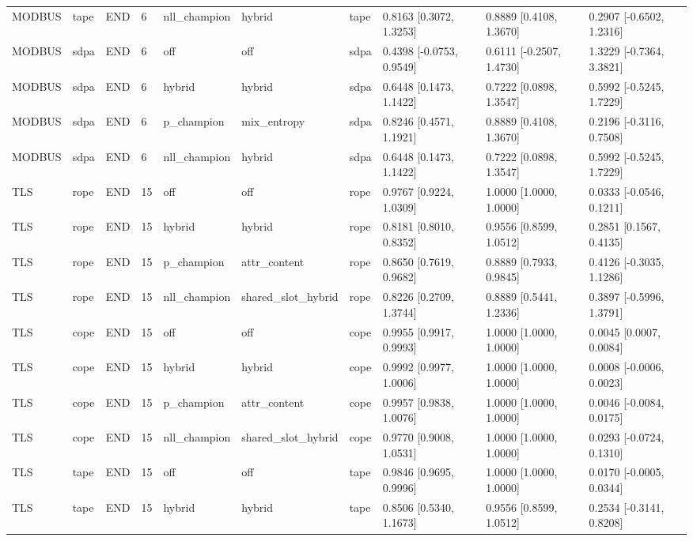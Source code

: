 \begin{tabular}{llllllllll}
MODBUS & tape & END & 6 & nll\_champion & hybrid & tape & 0.8163 [0.3072, 1.3253] & 0.8889 [0.4108, 1.3670] & 0.2907 [-0.6502, 1.2316] \\
MODBUS & sdpa & END & 6 & off & off & sdpa & 0.4398 [-0.0753, 0.9549] & 0.6111 [-0.2507, 1.4730] & 1.3229 [-0.7364, 3.3821] \\
MODBUS & sdpa & END & 6 & hybrid & hybrid & sdpa & 0.6448 [0.1473, 1.1422] & 0.7222 [0.0898, 1.3547] & 0.5992 [-0.5245, 1.7229] \\
MODBUS & sdpa & END & 6 & p\_champion & mix\_entropy & sdpa & 0.8246 [0.4571, 1.1921] & 0.8889 [0.4108, 1.3670] & 0.2196 [-0.3116, 0.7508] \\
MODBUS & sdpa & END & 6 & nll\_champion & hybrid & sdpa & 0.6448 [0.1473, 1.1422] & 0.7222 [0.0898, 1.3547] & 0.5992 [-0.5245, 1.7229] \\
TLS & rope & END & 15 & off & off & rope & 0.9767 [0.9224, 1.0309] & 1.0000 [1.0000, 1.0000] & 0.0333 [-0.0546, 0.1211] \\
TLS & rope & END & 15 & hybrid & hybrid & rope & 0.8181 [0.8010, 0.8352] & 0.9556 [0.8599, 1.0512] & 0.2851 [0.1567, 0.4135] \\
TLS & rope & END & 15 & p\_champion & attr\_content & rope & 0.8650 [0.7619, 0.9682] & 0.8889 [0.7933, 0.9845] & 0.4126 [-0.3035, 1.1286] \\
TLS & rope & END & 15 & nll\_champion & shared\_slot\_hybrid & rope & 0.8226 [0.2709, 1.3744] & 0.8889 [0.5441, 1.2336] & 0.3897 [-0.5996, 1.3791] \\
TLS & cope & END & 15 & off & off & cope & 0.9955 [0.9917, 0.9993] & 1.0000 [1.0000, 1.0000] & 0.0045 [0.0007, 0.0084] \\
TLS & cope & END & 15 & hybrid & hybrid & cope & 0.9992 [0.9977, 1.0006] & 1.0000 [1.0000, 1.0000] & 0.0008 [-0.0006, 0.0023] \\
TLS & cope & END & 15 & p\_champion & attr\_content & cope & 0.9957 [0.9838, 1.0076] & 1.0000 [1.0000, 1.0000] & 0.0046 [-0.0084, 0.0175] \\
TLS & cope & END & 15 & nll\_champion & shared\_slot\_hybrid & cope & 0.9770 [0.9008, 1.0531] & 1.0000 [1.0000, 1.0000] & 0.0293 [-0.0724, 0.1310] \\
TLS & tape & END & 15 & off & off & tape & 0.9846 [0.9695, 0.9996] & 1.0000 [1.0000, 1.0000] & 0.0170 [-0.0005, 0.0344] \\
TLS & tape & END & 15 & hybrid & hybrid & tape & 0.8506 [0.5340, 1.1673] & 0.9556 [0.8599, 1.0512] & 0.2534 [-0.3141, 0.8208] \\

\end{tabular}
